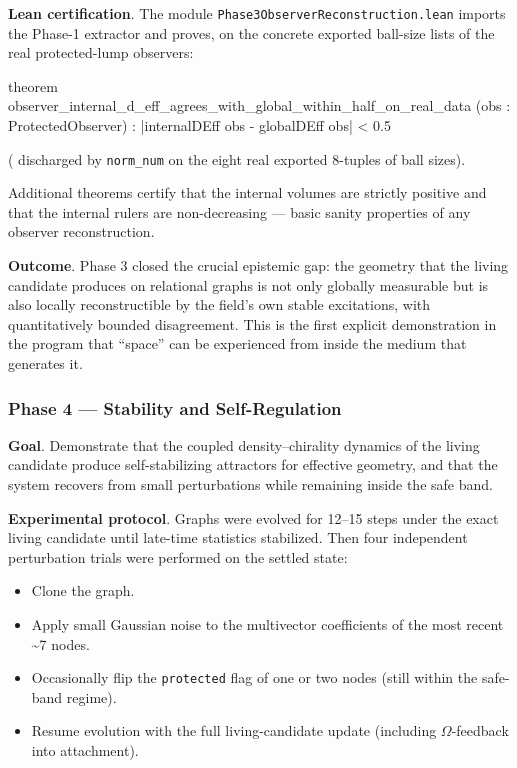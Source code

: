 \documentclass[
  11pt,
  a4paper,
]{article}
\newenvironment{Shaded}{\begin{snugshade}}{\end{snugshade}}
\newcommand{\NormalTok}[1]{#1}
\providecommand{\tightlist}{%
  \setlength{\itemsep}{0pt}\setlength{\parskip}{0pt}}
\begin{document}
\textbf{Lean certification}. The module
\texttt{Phase3ObserverReconstruction.lean} imports the Phase-1 extractor
and proves, on the concrete exported ball-size lists of the real
protected-lump observers:

\begin{Shaded}
\begin{Highlighting}[]
\NormalTok{theorem observer\_internal\_d\_eff\_agrees\_with\_global\_within\_half\_on\_real\_data}
\NormalTok{    (obs : ProtectedObserver) :}
\NormalTok{    |internalDEff obs {-} globalDEff obs| \textless{} 0.5}
\end{Highlighting}
\end{Shaded}

( discharged by \texttt{norm\_num} on the eight real exported 8-tuples
of ball sizes).

Additional theorems certify that the internal volumes are strictly
positive and that the internal rulers are non-decreasing --- basic
sanity properties of any observer reconstruction.

\textbf{Outcome}. Phase 3 closed the crucial epistemic gap: the geometry
that the living candidate produces on relational graphs is not only
globally measurable but is also locally reconstructible by the field's
own stable excitations, with quantitatively bounded disagreement. This
is the first explicit demonstration in the program that ``space'' can be
experienced from inside the medium that generates it.

\subsubsection{Phase 4 --- Stability and
Self-Regulation}\label{phase-4-stability-and-self-regulation}

\textbf{Goal}. Demonstrate that the coupled density--chirality dynamics
of the living candidate produce self-stabilizing attractors for
effective geometry, and that the system recovers from small
perturbations while remaining inside the safe band.

\textbf{Experimental protocol}. Graphs were evolved for 12--15 steps
under the exact living candidate until late-time statistics stabilized.
Then four independent perturbation trials were performed on the settled
state:

\begin{itemize}
\tightlist
\item
  Clone the graph.
\item
  Apply small Gaussian noise to the multivector coefficients of the most
  recent \textasciitilde7 nodes.
\item
  Occasionally flip the \texttt{protected} flag of one or two nodes
  (still within the safe-band regime).
\item
  Resume evolution with the full living-candidate update (including
  \(\Omega\)-feedback into attachment).
\end{itemize}
\end{document}
